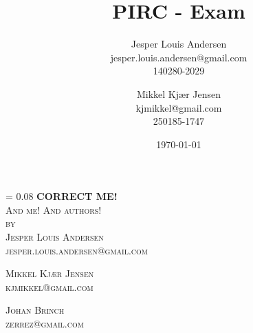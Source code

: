 \documentclass[a4paper, oneside, 10pt, draft]{memoir}
\author{Jesper Louis
  Andersen\\jesper.louis.andersen@gmail.com\\140280-2029
  \and
  Mikkel Kj\ae r Jensen \\ kjmikkel@gmail.com\\250185-1747}
\title{PIRC - Exam}
\date{\today}
\makeatletter
\renewcommand*{\titleM}{\begingroup%
  \drop = 0.08\textheight
  \centering
  {\Huge\bfseries CORRECT ME!}\\[\baselineskip]
  {\scshape And me! And authors!}\\[\baselineskip]
  {\scshape by}\\[\baselineskip]
  {\large\scshape Jesper Louis Andersen\\jesper.louis.andersen@gmail.com}\par
  {\large\scshape Mikkel Kj\ae r Jensen\\kjmikkel@gmail.com}\par
  {\large\scshape Johan Brinch\\zerrez@gmail.com}\par
  \endgroup}
\makeatother
\begin{document}
\titleM





%
%
%

\end{document}
